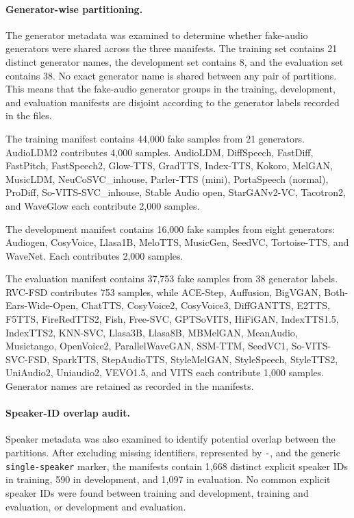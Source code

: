 \paragraph{Generator-wise partitioning.} The generator metadata was examined to determine whether fake-audio generators were shared across the three manifests. The training set contains 21 distinct generator names, the development set contains 8, and the evaluation set contains 38. No exact generator name is shared between any pair of partitions. This means that the fake-audio generator groups in the training, development, and evaluation manifests are disjoint according to the generator labels recorded in the files.

The training manifest contains 44,000 fake samples from 21 generators. AudioLDM2 contributes 4,000 samples. AudioLDM, DiffSpeech, FastDiff, FastPitch, FastSpeech2, Glow-TTS, GradTTS, Index-TTS, Kokoro, MelGAN, MusicLDM, NeuCoSVC\_inhouse, Parler-TTS (mini), PortaSpeech (normal), ProDiff, So-VITS-SVC\_inhouse, Stable Audio open, StarGANv2-VC, Tacotron2, and WaveGlow each contribute 2,000 samples.

The development manifest contains 16,000 fake samples from eight generators: Audiogen, CosyVoice, Llasa1B, MeloTTS, MusicGen, SeedVC, Tortoise-TTS, and WaveNet. Each contributes 2,000 samples.

The evaluation manifest contains 37,753 fake samples from 38 generator labels. RVC-FSD contributes 753 samples, while ACE-Step, Auffusion, BigVGAN, Both-Ears-Wide-Open, ChatTTS, CosyVoice2, CosyVoice3, DiffGANTTS, E2TTS, F5TTS, FireRedTTS2, Fish, Free-SVC, GPTSoVITS, HiFiGAN, IndexTTS1.5, IndexTTS2, KNN-SVC, Llasa3B, Llasa8B, MBMelGAN, MeanAudio, Musictango, OpenVoice2, ParallelWaveGAN, SSM-TTM, SeedVC1, So-VITS-SVC-FSD, SparkTTS, StepAudioTTS, StyleMelGAN, StyleSpeech, StyleTTS2, UniAudio2, Uniaudio2, VEVO1.5, and VITS each contribute 1,000 samples. Generator names are retained as recorded in the manifests.

\paragraph{Speaker-ID overlap audit.} Speaker metadata was also examined to identify potential overlap between the partitions. After excluding missing identifiers, represented by \texttt{-}, and the generic \texttt{single-speaker} marker, the manifests contain 1,668 distinct explicit speaker IDs in training, 590 in development, and 1,097 in evaluation. No common explicit speaker IDs were found between training and development, training and evaluation, or development and evaluation.

